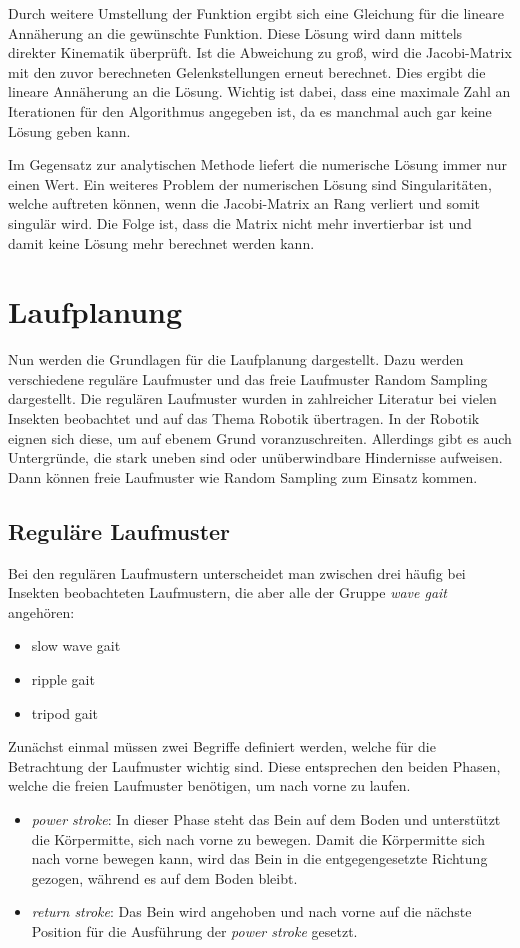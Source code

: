 Durch weitere Umstellung der Funktion ergibt sich eine Gleichung für die lineare Annäherung an die gewünschte Funktion. Diese Lösung wird dann mittels direkter Kinematik überprüft. Ist die Abweichung zu groß, wird die Jacobi-Matrix mit den zuvor berechneten Gelenkstellungen erneut berechnet. Dies ergibt die lineare Annäherung an die Lösung. Wichtig ist dabei, dass eine maximale Zahl an Iterationen für den Algorithmus angegeben ist, da es manchmal auch gar keine Lösung geben kann.

Im Gegensatz zur analytischen Methode liefert die numerische Lösung immer nur einen Wert. Ein weiteres Problem der numerischen Lösung sind Singularitäten, welche auftreten können, wenn die Jacobi-Matrix an Rang verliert und somit singulär wird. Die Folge ist, dass die Matrix nicht mehr invertierbar ist und damit keine Lösung mehr berechnet werden kann.

\section{Laufplanung}

Nun werden die Grundlagen für die Laufplanung dargestellt. Dazu werden verschiedene reguläre Laufmuster und das freie Laufmuster Random Sampling dargestellt. Die regulären Laufmuster wurden in zahlreicher Literatur bei vielen Insekten beobachtet und auf das Thema Robotik übertragen. \autocite{ferrell1995comparison} \autocite{wilson1966insect} In der Robotik eignen sich diese, um auf ebenem Grund voranzuschreiten. Allerdings gibt es auch Untergründe, die stark uneben sind oder unüberwindbare Hindernisse aufweisen. Dann können freie Laufmuster wie Random Sampling zum Einsatz kommen.

\subsection{Reguläre Laufmuster}

Bei den regulären Laufmustern unterscheidet man zwischen drei häufig bei Insekten beobachteten Laufmustern, die aber alle der Gruppe \emph{wave gait} angehören:
\begin{itemize}
\item slow wave gait
\item ripple gait
\item tripod gait
\end{itemize}

Zunächst einmal müssen zwei Begriffe definiert werden, welche für die Betrachtung der Laufmuster wichtig sind. Diese entsprechen den beiden Phasen, welche die freien Laufmuster benötigen, um nach vorne zu laufen.
\begin{itemize}
\item \emph{power stroke}: In dieser Phase steht das Bein auf dem Boden und unterstützt die Körpermitte, sich nach vorne zu bewegen. Damit die Körpermitte sich nach vorne bewegen kann, wird das Bein in die entgegengesetzte Richtung gezogen, während es auf dem Boden bleibt.
\item \emph{return stroke}: Das Bein wird angehoben und nach vorne auf die nächste Position für die Ausführung der \emph{power stroke} gesetzt.
\end{itemize}

